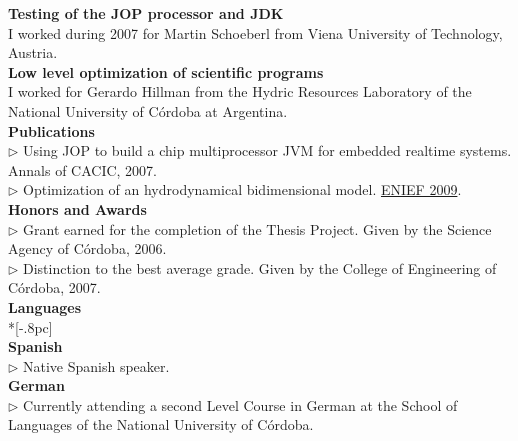 \documentclass[a4paper,11pt,english]{article}
\begin{document}
{\bf Testing of the JOP processor and JDK}\\
I worked during 2007 for Martin Schoeberl from Viena University of Technology, Austria.
\\

{\bf Low level optimization of scientific programs}\\
I worked for Gerardo Hillman from the Hydric Resources  Laboratory of the National University of C\'ordoba at Argentina.
\\

{\bf Publications} \\
$\triangleright$ Using JOP to build a chip multiprocessor JVM for embedded realtime systems. Annals of CACIC, 2007.\\
$\triangleright$ Optimization of an hydrodynamical bidimensional model. \href{http://enief2009.pladema.net/index.html}{ENIEF 2009}. \\


{\bf Honors and Awards} \\
$\triangleright$ Grant earned for the completion of the Thesis Project.
Given by the Science Agency of C\'ordoba, 2006.\\ 
$\triangleright$ Distinction to the best average grade.
Given by the College of Engineering of C\'ordoba, 2007.\\

{\large \bf Languages} \\*[-.8pc]
\underline{\hspace{6in}} \\

{\bf Spanish}\\
$\triangleright$ Native Spanish speaker.
\\

{\bf German}\\
$\triangleright$ Currently attending a second Level Course in German 
at the School of Languages of the National University of C\'ordoba.
 \\
\end{document}
